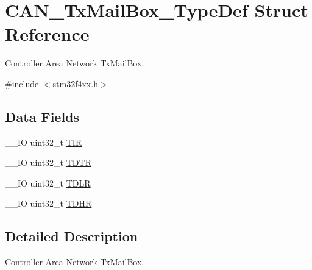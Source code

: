 \hypertarget{struct_c_a_n___tx_mail_box___type_def}{\section{C\-A\-N\-\_\-\-Tx\-Mail\-Box\-\_\-\-Type\-Def Struct Reference}
\label{struct_c_a_n___tx_mail_box___type_def}
}


Controller Area Network Tx\-Mail\-Box.  




{\ttfamily \#include $<$stm32f4xx.\-h$>$}

\subsection*{Data Fields}
\begin{DoxyCompactItemize}
\item 
\-\_\-\-\_\-\-I\-O uint32\-\_\-t \hyperlink{struct_c_a_n___tx_mail_box___type_def_a6921aa1c578a7d17c6e0eb33a73b6630}{T\-I\-R}
\item 
\-\_\-\-\_\-\-I\-O uint32\-\_\-t \hyperlink{struct_c_a_n___tx_mail_box___type_def_aed87bed042dd9523ce086119a3bab0ea}{T\-D\-T\-R}
\item 
\-\_\-\-\_\-\-I\-O uint32\-\_\-t \hyperlink{struct_c_a_n___tx_mail_box___type_def_aded1359e1a32512910bff534d57ade68}{T\-D\-L\-R}
\item 
\-\_\-\-\_\-\-I\-O uint32\-\_\-t \hyperlink{struct_c_a_n___tx_mail_box___type_def_a90f7c1cf22683459c632d6040366eddf}{T\-D\-H\-R}
\end{DoxyCompactItemize}


\subsection{Detailed Description}
Controller Area Network Tx\-Mail\-Box. 

